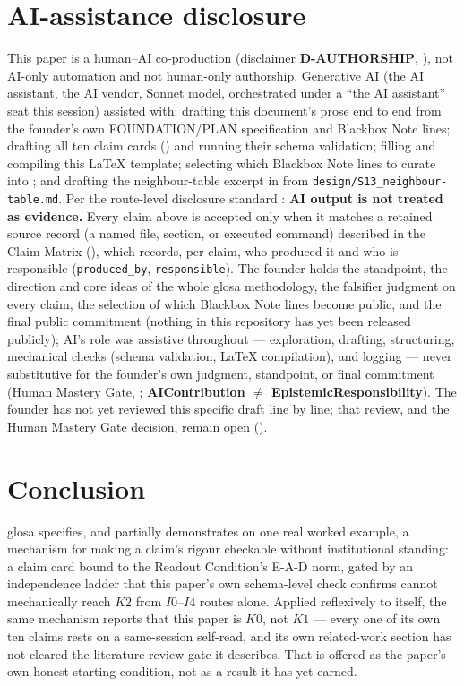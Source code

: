 \documentclass[11pt]{article}
\begin{document}
\section{AI-assistance disclosure}
\label{sec:ai-disclosure}
This paper is a human--AI co-production (disclaimer \textbf{D-AUTHORSHIP},
), not AI-only automation and not human-only
authorship. Generative AI (the AI assistant, the AI vendor, Sonnet model, orchestrated under a ``the AI assistant'' seat
this session) assisted with: drafting this document's prose end to end from the founder's own
FOUNDATION/PLAN specification and Blackbox Note lines; drafting all ten claim cards
() and running their schema validation; filling and compiling this LaTeX
template; selecting which Blackbox Note lines to curate into ; and drafting the
neighbour-table excerpt in  from \texttt{design/S13\_neighbour-table.md}. Per the
route-level disclosure standard \citep{lahtee2026zeroreadout}: \textbf{AI output is not treated as
evidence.} Every claim above is accepted only when it matches a retained source record (a named
file, section, or executed command) described in the Claim Matrix
(), which records, per claim, who produced it and who is responsible
(\texttt{produced\_by}, \texttt{responsible}). The founder holds the standpoint, the direction and
core ideas of the whole glosa methodology, the falsifier judgment on every claim, the selection of
which Blackbox Note lines become public, and the final public commitment (nothing in this
repository has yet been released publicly); AI's role was assistive throughout ---
exploration, drafting, structuring, mechanical checks (schema validation, LaTeX compilation), and
logging --- never substitutive for the founder's own judgment, standpoint, or final commitment
(Human Mastery Gate, ; \textbf{AIContribution $\neq$
EpistemicResponsibility}). The founder has not yet reviewed this specific draft line by line; that
review, and the Human Mastery Gate decision, remain open ().

\section{Conclusion}
\label{sec:conclusion}
glosa specifies, and partially demonstrates on one real worked example, a mechanism for making a
claim's rigour checkable without institutional standing: a claim card bound to the Readout
Condition's E-A-D norm, gated by an independence ladder that this paper's own schema-level check
confirms cannot mechanically reach $K2$ from $I0$--$I4$ routes alone. Applied reflexively to
itself, the same mechanism reports that this paper is $K0$, not $K1$ --- every one of its own ten
claims rests on a same-session self-read, and its own related-work section has not cleared the
literature-review gate it describes. That is offered as the paper's own honest starting condition,
not as a result it has yet earned.
\end{document}
